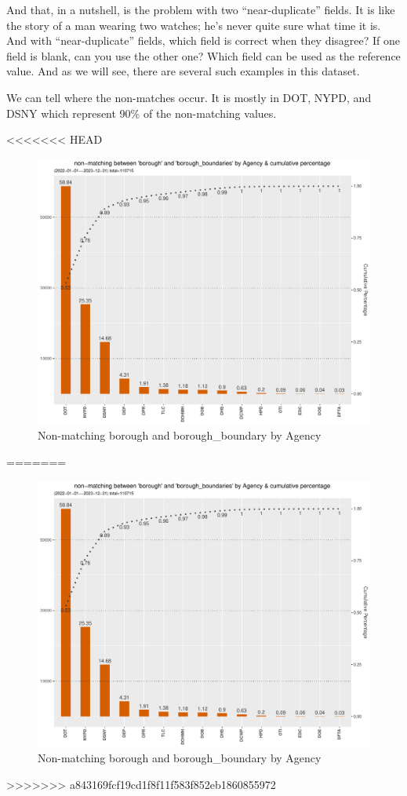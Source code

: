 \documentclass[12pt, titlepage]{article}
\begin{document}
And that, in a nutshell, is the problem with two ``near-duplicate'' 
fields. It is like the  story of a man wearing two watches; he's never 
quite sure what time it is. And with ``near-duplicate'' fields, which 
field is correct when they disagree? If one field is blank, can you 
use the other one? Which field can be used as the reference value. And 
as we will see, there are several such examples in this dataset.

We can tell where the non-matches occur. It is mostly in DOT, NYPD, 
and DSNY which represent 90\% of the non-matching values.

<<<<<<< HEAD
\begin{figure}[tbp]
	\centering
	\includegraphics[width = \textwidth]{non_matching_borough_boundaries_chart.pdf}
	\caption{Non-matching borough and borough\_boundary by Agency}
	\label{fig:borough-boundaries}
\end{figure}	
=======


	\begin{figure}[tbp]
		\centering
		\includegraphics[width = \textwidth]{non_matching_borough_boundaries_chart.pdf}
		\caption{Non-matching borough and borough\_boundary by Agency}
		\label{fig:borough-boundaries}
	\end{figure}	
>>>>>>> a843169fcf19cd1f8f11f583f852eb1860855972
	
\end{document}
